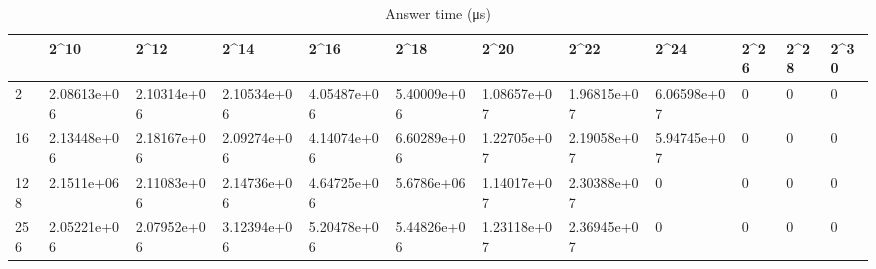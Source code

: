 \begin{table}
\caption{Answer time (μs)}
\label{tab:answer_time}
\begin{tabular}{llllllllllll}
\toprule
 & 2^{10} & 2^{12} & 2^{14} & 2^{16} & 2^{18} & 2^{20} & 2^{22} & 2^{24} & 2^{26} & 2^{28} & 2^{30} \\
\midrule
2 & 2.08613e+06 & 2.10314e+06 & 2.10534e+06 & 4.05487e+06 & 5.40009e+06 & 1.08657e+07 & 1.96815e+07 & 6.06598e+07 & 0 & 0 & 0 \\
16 & 2.13448e+06 & 2.18167e+06 & 2.09274e+06 & 4.14074e+06 & 6.60289e+06 & 1.22705e+07 & 2.19058e+07 & 5.94745e+07 & 0 & 0 & 0 \\
128 & 2.1511e+06 & 2.11083e+06 & 2.14736e+06 & 4.64725e+06 & 5.6786e+06 & 1.14017e+07 & 2.30388e+07 & 0 & 0 & 0 & 0 \\
256 & 2.05221e+06 & 2.07952e+06 & 3.12394e+06 & 5.20478e+06 & 5.44826e+06 & 1.23118e+07 & 2.36945e+07 & 0 & 0 & 0 & 0 \\
\bottomrule
\end{tabular}
\end{table}
